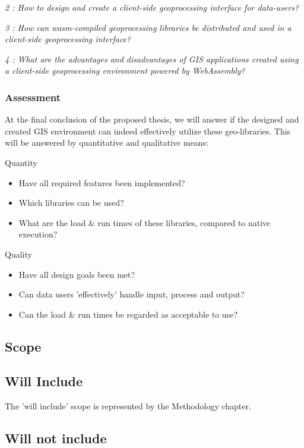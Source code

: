 \textit{2 : How to design and create a client-side geoprocessing interface for data-users?}

\textit{3 : How can wasm-compiled geoprocessing libraries be distributed and used in a client-side geoprocessing interface?}

\textit{4 : What are the advantages and disadvantages of GIS applications created using a client-side geoprocessing environment powered by WebAssembly?}

\newpage
\subsubsection*{Assessment}

At the final conclusion of the proposed thesis, we will answer if the designed and created GIS environment can indeed effectively utilize these geo-libraries.
This will be answered by quantitative and qualitative means:

Quantity
\begin{itemize}
    \item Have all required features been implemented?
    \item Which libraries can be used?
    \item What are the load \& run times of these libraries, compared to native execution?
\end{itemize} 

Quality
\begin{itemize}
    \item Have all design goals been met?
    \item Can data users 'effectively' handle input, process and output?
    \item Can the load \& run times be regarded as acceptable to use? 
\end{itemize} 


\newpage
\subsection{Scope}
\subsection*{Will Include}

The 'will include' scope is represented by the Methodology chapter. 

\subsection*{Will not include}

